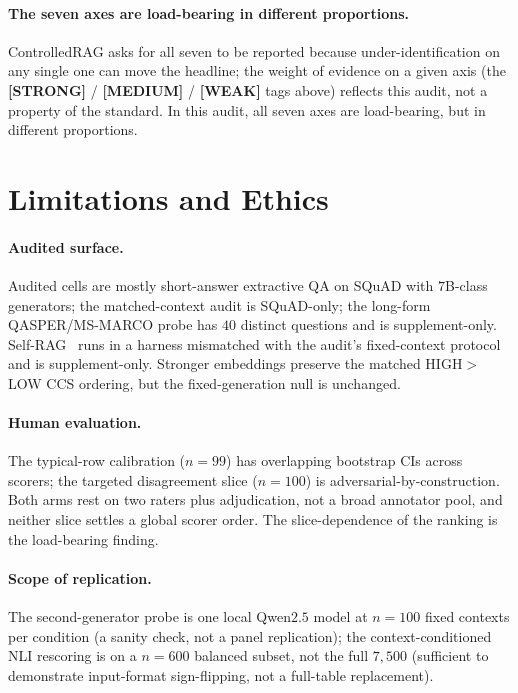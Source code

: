 \paragraph{The seven axes are load-bearing in different proportions.}
ControlledRAG asks for all seven to be reported because
under-identification on any single one can move the headline; the
weight of evidence on a given axis (the \textbf{[STRONG]} /
\textbf{[MEDIUM]} / \textbf{[WEAK]} tags above) reflects this audit,
not a property of the standard. In this audit, all seven axes are
load-bearing, but in different proportions.

\section{Limitations and Ethics}
\label{sec:limits}

\paragraph{Audited surface.} Audited cells are mostly short-answer
extractive QA on SQuAD with $7$B-class generators; the matched-context
audit is SQuAD-only; the long-form QASPER/MS-MARCO probe has $40$
distinct questions and is supplement-only.
Self-RAG~\citep{asai2024selfrag} runs in a harness mismatched with
the audit's fixed-context protocol and is supplement-only. Stronger
embeddings preserve the matched HIGH$>$LOW CCS ordering, but the
fixed-generation null is unchanged.

\paragraph{Human evaluation.} The typical-row calibration ($n=99$)
has overlapping bootstrap CIs across scorers; the targeted
disagreement slice ($n=100$) is adversarial-by-construction. Both
arms rest on two raters plus adjudication, not a broad annotator
pool, and neither slice settles a global scorer order. The
slice-dependence of the ranking is the load-bearing finding.

\paragraph{Scope of replication.} The second-generator probe is one
local Qwen$2.5$ model at $n=100$ fixed contexts per condition (a
sanity check, not a panel replication); the context-conditioned NLI
rescoring is on a $n=600$ balanced subset, not the full $7{,}500$
(sufficient to demonstrate input-format sign-flipping, not a
full-table replacement).

